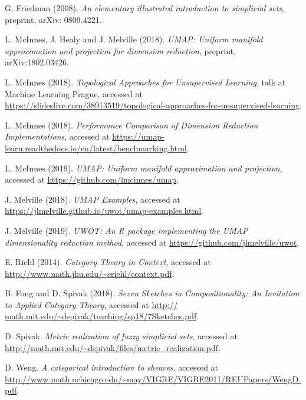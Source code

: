 \documentclass[a4paper,11pt,leqno]{article}
\theoremstyle{definition}
\begin{document}
\begin{thebibliography}{99}

	G. Friedman (2008). \textit{An elementary illustrated introduction to simplicial sets}, preprint, arXiv: 0809.4221.

	L. McInnes, J. Healy and J. Melville (2018). \textit{UMAP: Uniform manifold approximation and projection for dimension reduction}, preprint, arXiv:1802.03426.

	L. McInnes (2018). \textit{Topological Approaches for Unsupervised Learning}, talk at Machine Learning Prague, accessed at \url{https://slideslive.com/38913519/topological-approaches-for-unsupervised-learning}.

	L. McInnes (2018). \textit{Performance Comparison of Dimension Reduction Implementations}, accessed at \url{https://umap-learn.readthedocs.io/en/latest/benchmarking.html}.

	L. McInnes (2019). \textit{UMAP: Uniform manifold approximation and projection}, accessed at \url{https://github.com/lmcinnes/umap}.

	J. Melville (2018). \textit{UMAP Examples}, accessed at \url{https://jlmelville.github.io/uwot/umap-examples.html}.

	J. Melville (2019). \textit{UWOT: An R package implementing the UMAP dimensionality reduction method}, accessed at \url{https://github.com/jlmelville/uwot}.

	E. Riehl (2014). \textit{Category Theory in Context}, accessed at \url{http://www.math.jhu.edu/~eriehl/context.pdf}.

	B. Fong and D. Spivak (2018). \textit{Seven Sketches in Compositionality: An Invitation to Applied Category Theory}, accessed at \url{http://
math.mit.edu/~dspivak/teaching/sp18/7Sketches.pdf}.

	D. Spivak. \textit{Metric realization of fuzzy simplicial sets}, accessed at \url{http://math.mit.edu/~dspivak/files/metric_realization.pdf}.

	D. Weng. \textit{A categorical introduction to sheaves}, accessed at \url{http://www.math.uchicago.edu/~may/VIGRE/VIGRE2011/REUPapers/WengD.pdf}.

\end{thebibliography}
\end{document}
